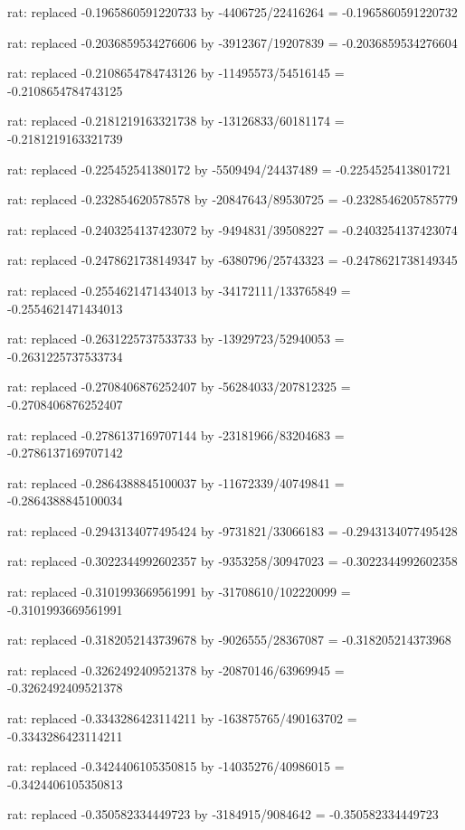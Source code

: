 \documentclass[a4paper,10pt]{article}
\begin{document}
\begin{eulernotebook}
\begin{eulercomment}
\begin{eulercomment}
\begin{eulercomment}
\begin{eulercomment}
\begin{eulercomment}
\begin{eulercomment}
\begin{eulercomment}
\begin{eulercomment}
\begin{eulercomment}
\begin{eulercomment}
\begin{eulercomment}
\begin{eulercomment}
\begin{eulercomment}
\begin{eulercomment}
\begin{eulercomment}
\begin{eulercomment}
\begin{euleroutput}
  rat: replaced -0.1965860591220733 by -4406725/22416264 = -0.1965860591220732
  
  rat: replaced -0.2036859534276606 by -3912367/19207839 = -0.2036859534276604
  
  rat: replaced -0.2108654784743126 by -11495573/54516145 = -0.2108654784743125
  
  rat: replaced -0.2181219163321738 by -13126833/60181174 = -0.2181219163321739
  
  rat: replaced -0.225452541380172 by -5509494/24437489 = -0.2254525413801721
  
  rat: replaced -0.232854620578578 by -20847643/89530725 = -0.2328546205785779
  
  rat: replaced -0.2403254137423072 by -9494831/39508227 = -0.2403254137423074
  
  rat: replaced -0.2478621738149347 by -6380796/25743323 = -0.2478621738149345
  
  rat: replaced -0.2554621471434013 by -34172111/133765849 = -0.2554621471434013
  
  rat: replaced -0.2631225737533733 by -13929723/52940053 = -0.2631225737533734
  
  rat: replaced -0.2708406876252407 by -56284033/207812325 = -0.2708406876252407
  
  rat: replaced -0.2786137169707144 by -23181966/83204683 = -0.2786137169707142
  
  rat: replaced -0.2864388845100037 by -11672339/40749841 = -0.2864388845100034
  
  rat: replaced -0.2943134077495424 by -9731821/33066183 = -0.2943134077495428
  
  rat: replaced -0.3022344992602357 by -9353258/30947023 = -0.3022344992602358
  
  rat: replaced -0.3101993669561991 by -31708610/102220099 = -0.3101993669561991
  
  rat: replaced -0.3182052143739678 by -9026555/28367087 = -0.318205214373968
  
  rat: replaced -0.3262492409521378 by -20870146/63969945 = -0.3262492409521378
  
  rat: replaced -0.3343286423114211 by -163875765/490163702 = -0.3343286423114211
  
  rat: replaced -0.3424406105350815 by -14035276/40986015 = -0.3424406105350813
  
  rat: replaced -0.350582334449723 by -3184915/9084642 = -0.350582334449723
  

\end{euleroutput}
\end{eulercomment}
\end{eulercomment}
\end{eulercomment}
\end{eulercomment}
\end{eulercomment}
\end{eulercomment}
\end{eulercomment}
\end{eulercomment}
\end{eulercomment}
\end{eulercomment}
\end{eulercomment}
\end{eulercomment}
\end{eulercomment}
\end{eulercomment}
\end{eulercomment}
\end{eulercomment}
\end{eulernotebook}
\end{document}
